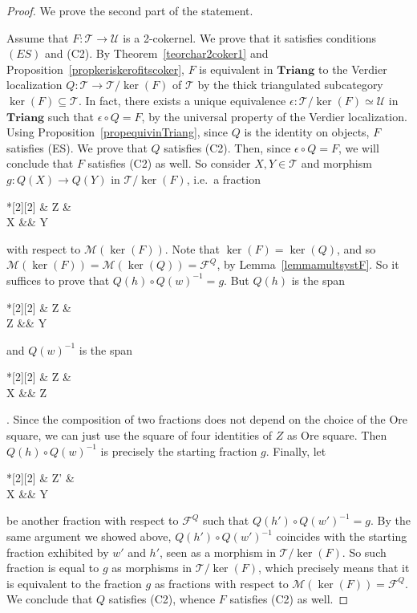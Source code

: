 \documentclass[11pt,reqno,a4paper]{amsart}
\theoremstyle{definition}
\theoremstyle{remark}
\def\nameit#1{\textrm{#1}~}
\def\thex{\nameit{Theorem}}
\def\prox{\nameit{Proposition}}
\def\lemx{\nameit{Lemma}}
\newcommand{\T}{\mathcal{T}}
\newcommand{\U}{\mathcal{U}}
\newcommand{\0}{\mathbf{0}}
\renewcommand{\1}{\mathbf{1}}
\newcommand{\Triang}{\mathbf{Triang}}
\def\:{\colon}
\def\c{\circ}
\newcommand{\cont}{\subseteq}
\begin{document}
\begin{proof}
    We prove the second part of the statement.

    Assume that $F\:\T \to \U$ is a 2-cokernel. We prove that it satisfies conditions $(ES)$ and (C2). By \thex\ref{teorchar2coker1} and \prox\ref{propkeriskerofitscoker}, $F$ is equivalent in $\Triang$ to the Verdier localization $Q\:\T\to \T/\ker(F)$ of $\T$ by the thick triangulated subcategory $\ker(F)\cont \T$. In fact, there exists a unique equivalence $\epsilon\:\T/\ker(F)\simeq \U$ in $\Triang$ such that $\epsilon\c Q=F$, by the universal property of the Verdier localization. Using \prox\ref{propequivinTriang}, since $Q$ is the identity on objects, $F$ satisfies (ES). We prove that $Q$ satisfies (C2). Then, since $\epsilon\c Q=F$, we will conclude that $F$ satisfies (C2) as well. So consider $X,Y\in \T$ and morphism $g\:Q(X)\to Q(Y)$ in $\T/\ker(F)$, i.e.\ a fraction \begin{cd}*[2][2] \& Z \& \\[-2ex]
	X \&\& Y
	\arrow["w"', from=1-2, to=2-1]
	\arrow["h", from=1-2, to=2-3]\end{cd} with respect to $\mathcal{M}(\ker(F))$. Note that $\ker(F)=\ker(Q)$, and so $\mathcal{M}(\ker(F))=\mathcal{M}(\ker(Q))=\mathcal{F}^Q$, by \lemx\ref{lemmamultsystF}. So it suffices to prove that $Q(h)\c Q(w)^{-1}=g$. But $Q(h)$ is the span \begin{cd}*[2][2] \& Z \& \\[-2ex]
	Z \&\& Y
	\arrow[equal, from=1-2, to=2-1]
	\arrow["h", from=1-2, to=2-3]\end{cd} and $Q(w)^{-1}$ is the span \begin{cd}*[2][2] \& Z \& \\[-2ex]
	X \&\& Z
	\arrow["w"', from=1-2, to=2-1]
	\arrow[equal, from=1-2, to=2-3]\end{cd}. Since the composition of two fractions does not depend on the choice of the Ore square, we can just use the square of four identities of $Z$ as Ore square. Then $Q(h)\c Q(w)^{-1}$ is precisely the starting fraction $g$. Finally, let \begin{cd}*[2][2] \& Z' \& \\[-2ex]
	X \&\& Y
	\arrow["w'"', from=1-2, to=2-1]
	\arrow["h'", from=1-2, to=2-3]\end{cd} be another fraction with respect to $\mathcal{F}^Q$ such that $Q(h')\c Q(w')^{-1}=g$. By the same argument we showed above, $Q(h')\c Q(w')^{-1}$ coincides with the starting fraction exhibited by $w'$ and $h'$, seen as a morphism in $\T/\ker(F)$. So such fraction is equal to $g$ as morphisms in $\T/\ker(F)$, which precisely means that it is equivalent to the fraction $g$ as fractions with respect to $\mathcal{M}(\ker(F))=\mathcal{F}^Q$. We conclude that $Q$ satisfies (C2), whence $F$ satisfies (C2) as well.


\end{proof}
\end{document}
